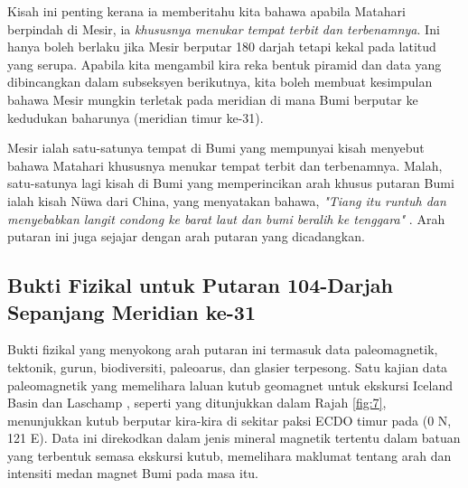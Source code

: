 \documentclass[10pt,twocolumn,letterpaper]{article}
\begin{document}
Kisah ini penting kerana ia memberitahu kita bahawa apabila Matahari berpindah di Mesir, ia \textit{khususnya menukar tempat terbit dan terbenamnya}. Ini hanya boleh berlaku jika Mesir berputar 180 darjah tetapi kekal pada latitud yang serupa. Apabila kita mengambil kira reka bentuk piramid dan data yang dibincangkan dalam subseksyen berikutnya, kita boleh membuat kesimpulan bahawa Mesir mungkin terletak pada meridian di mana Bumi berputar ke kedudukan baharunya (meridian timur ke-31).

Mesir ialah satu-satunya tempat di Bumi yang mempunyai kisah menyebut bahawa Matahari khususnya menukar tempat terbit dan terbenamnya. Malah, satu-satunya lagi kisah di Bumi yang memperincikan arah khusus putaran Bumi ialah kisah Nüwa dari China, yang menyatakan bahawa, \textit{"Tiang itu runtuh dan menyebabkan langit condong ke barat laut dan bumi beralih ke tenggara"} \cite{8}. Arah putaran ini juga sejajar dengan arah putaran yang dicadangkan.

\subsection{Bukti Fizikal untuk Putaran 104-Darjah Sepanjang Meridian ke-31}

Bukti fizikal yang menyokong arah putaran ini termasuk data paleomagnetik, tektonik, gurun, biodiversiti, paleoarus, dan glasier terpesong.
Satu kajian data paleomagnetik yang memelihara laluan kutub geomagnet untuk ekskursi Iceland Basin dan Laschamp \cite{35}, seperti yang ditunjukkan dalam Rajah \ref{fig:7}, menunjukkan kutub berputar kira-kira di sekitar paksi ECDO timur pada (0 N, 121 E). Data ini direkodkan dalam jenis mineral magnetik tertentu dalam batuan yang terbentuk semasa ekskursi kutub, memelihara maklumat tentang arah dan intensiti medan magnet Bumi pada masa itu.
\end{document}
